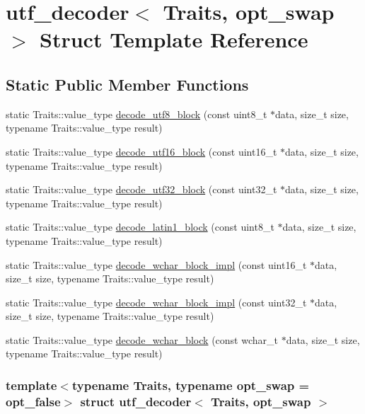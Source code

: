 \hypertarget{structutf__decoder}{
\section{utf\_\-decoder$<$ Traits, opt\_\-swap $>$ Struct Template Reference}
\label{structutf__decoder}
}
\subsection*{Static Public Member Functions}
\begin{DoxyCompactItemize}
\item 
static Traits::value\_\-type \hyperlink{structutf__decoder_a671829bbdba1eac5c8bd2bf781eae498}{decode\_\-utf8\_\-block} (const uint8\_\-t $\ast$data, size\_\-t size, typename Traits::value\_\-type result)
\item 
static Traits::value\_\-type \hyperlink{structutf__decoder_ac22afd983ac79318f0e7d07669bda8d1}{decode\_\-utf16\_\-block} (const uint16\_\-t $\ast$data, size\_\-t size, typename Traits::value\_\-type result)
\item 
static Traits::value\_\-type \hyperlink{structutf__decoder_a8bed41cc707328e8d8ab91fd7c3c943e}{decode\_\-utf32\_\-block} (const uint32\_\-t $\ast$data, size\_\-t size, typename Traits::value\_\-type result)
\item 
static Traits::value\_\-type \hyperlink{structutf__decoder_a3f728755fa7cc552e30e8d8776cad1ce}{decode\_\-latin1\_\-block} (const uint8\_\-t $\ast$data, size\_\-t size, typename Traits::value\_\-type result)
\item 
static Traits::value\_\-type \hyperlink{structutf__decoder_a56b161067860fde1ed534ac3b7399e36}{decode\_\-wchar\_\-block\_\-impl} (const uint16\_\-t $\ast$data, size\_\-t size, typename Traits::value\_\-type result)
\item 
static Traits::value\_\-type \hyperlink{structutf__decoder_a3bd423d3ce99b245c76be8a0796d951b}{decode\_\-wchar\_\-block\_\-impl} (const uint32\_\-t $\ast$data, size\_\-t size, typename Traits::value\_\-type result)
\item 
static Traits::value\_\-type \hyperlink{structutf__decoder_a5953fd0661c64408e08161342e4c538d}{decode\_\-wchar\_\-block} (const wchar\_\-t $\ast$data, size\_\-t size, typename Traits::value\_\-type result)
\end{DoxyCompactItemize}
\subsubsection*{template$<$typename Traits, typename opt\_\-swap = opt\_\-false$>$ struct utf\_\-decoder$<$ Traits, opt\_\-swap $>$}



